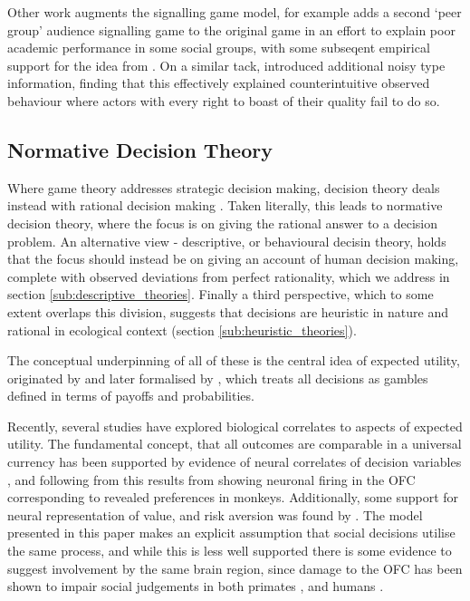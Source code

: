 Other work augments the signalling game model, for example \citet{Austen-Smith2005} adds a second `peer group' audience signalling game to the original \citeauthor{Spence1973} game in an effort to explain poor academic performance in some social groups, with some subseqent empirical support for the idea from \citet{Jr2010}. On a similar tack, \citet{Feltovich2002} introduced additional noisy type information, finding that this effectively explained counterintuitive observed behaviour where actors with every right to boast of their quality fail to do so.

\subsection{Normative Decision Theory}

Where game theory addresses strategic decision making, decision theory deals instead with rational decision making \citep{Peterson2009}.  Taken literally, this leads to normative decision theory, where the focus is on giving the rational answer to a decision problem. An alternative view - descriptive, or behavioural decisin theory, holds that the focus should instead be on giving an account of human decision making, complete with observed deviations from perfect rationality, which we address in section \ref{sub:descriptive_theories}. Finally a third perspective, which to some extent overlaps this division, suggests that decisions are heuristic in nature and rational in ecological context (section \ref{sub:heuristic_theories}).

The conceptual underpinning of all of these is the central idea of expected utility, originated by \citet{Bernoulli1954} and later formalised by \citet{Neumann1953}, which treats all decisions as gambles defined in terms of payoffs and probabilities.

Recently, several studies have explored biological correlates to aspects of expected utility. The fundamental concept, that all outcomes are comparable in a universal currency has been supported by evidence of neural correlates of decision variables \citep{Platt1999}, and following from this results from \citet{Padoa-Schioppa2006,Padoa-Schioppa2008} showing neuronal firing in the \ac{OFC} corresponding to revealed preferences in monkeys. Additionally, some support for neural representation of value, and risk aversion was found by \citet{Christopoulos2009}. The model presented in this paper makes an explicit assumption that social decisions utilise the same process, and while this is less well supported there is some evidence to suggest involvement by the same brain region, since damage to the \ac{OFC} has been shown to impair social judgements in both primates \citep{Watson2012}, and humans \citep{Willis2010}.

